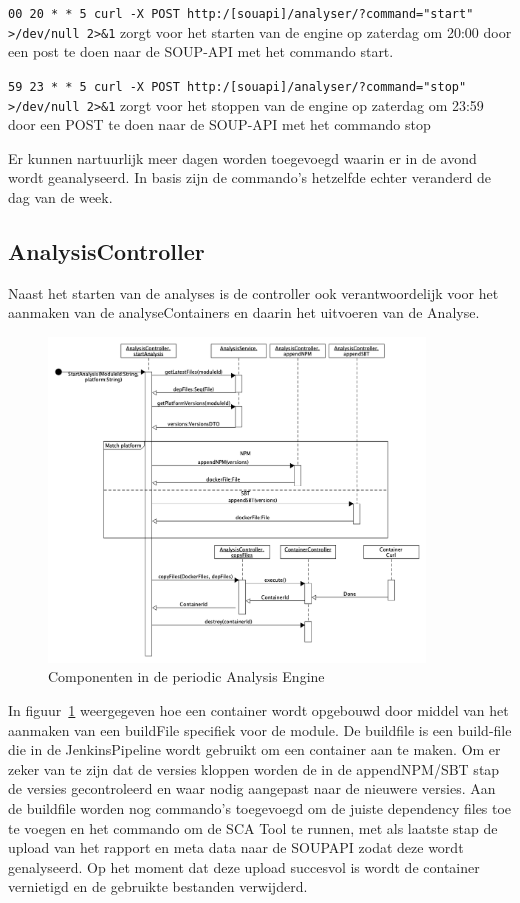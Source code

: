 \texttt{00 20 * * 5 curl -X POST http:/[souapi]/analyser/?command="start" >/dev/null 2>\&1} zorgt voor het starten van de engine op zaterdag om 20:00 door een post te doen naar de SOUP-API met het commando start.

\texttt{59 23 * * 5 curl -X POST http:/[souapi]/analyser/?command="stop" >/dev/null 2>\&1} zorgt voor het stoppen van de engine op zaterdag om 23:59 door een POST te doen naar de SOUP-API met het commando stop

Er kunnen nartuurlijk meer dagen worden toegevoegd waarin er in de avond wordt geanalyseerd. In basis zijn de commando's hetzelfde echter veranderd de dag van de week.

\subsection{AnalysisController}\label{subsec:analysiscontroller}
Naast het starten van de analyses is de controller ook verantwoordelijk voor het aanmaken van de analyseContainers en daarin het uitvoeren van de Analyse.
\begin{figure}[bth]
    \myfloatalign
    \includegraphics[width=10cm]{gfx/umlet/exports/PAE-CreateContainer}
    \caption{Componenten in de periodic Analysis Engine}
    \label{fig:paeSeq}
\end{figure}
In figuur~\ref{fig:paeSeq} weergegeven hoe een container wordt opgebouwd door middel van het aanmaken van een buildFile specifiek voor de module. De buildfile is een build-file die in de JenkinsPipeline wordt gebruikt om een container aan te maken. Om er zeker van te zijn dat de versies kloppen worden de in de appendNPM/SBT stap de versies gecontroleerd en waar nodig aangepast naar de nieuwere versies. Aan de buildfile worden nog commando's toegevoegd om de juiste dependency files toe te voegen en het commando om de SCA Tool te runnen, met als laatste stap de upload van het rapport en meta data naar de SOUPAPI zodat deze wordt genalyseerd. Op het moment dat deze upload succesvol is wordt de container vernietigd en de gebruikte bestanden verwijderd.
%

